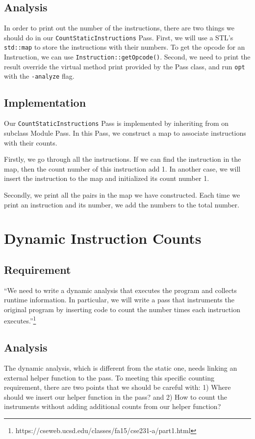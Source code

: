 \documentclass{acm_proc_article-sp}
\begin{document}
\subsection{Analysis}
In order to print out the number of the instructions, there are two things we should do in our {\tt CountStaticInstructions} Pass. First, we will use a STL's {\tt std::map} to store the instructions with their numbers. To get the opcode for an Instruction, we can use {\tt Instruction::getOpcode()}.  Second, we need to print the result override the virtual method print provided by the Pass class, and run {\tt opt} with the {\tt -analyze} flag.

\subsection{Implementation}
Our {\tt CountStaticInstructions} Pass is implemented by inheriting from on subclass Module Pass. In this Pass, we construct a map to associate instructions with their counts. 

Firstly, we go through all the instructions. If we can find the instruction in the map, then the count number of this instruction add 1. In another case, we will insert the instruction to the map and initialized its count number 1.

Secondly, we print all the {\tt < key, value>} pairs in the map we have constructed. Each time we print an instruction and its number, we add the numbers to the total number. 


\section{Dynamic Instruction Counts}

\subsection{Requirement}

``We need to write a dynamic analysis that executes the program and collects runtime information. In particular, we will write a pass that instruments the original program by inserting code to count the number times each instruction executes.''\footnote{\small https://cseweb.ucsd.edu/classes/fa15/cse231-a/part1.html}

\subsection{Analysis}
The dynamic analysis, which is different from the static one, needs linking an external helper function to the pass. To meeting this specific counting requirement, there are two points that we should be careful with: 1) Where should we insert our helper function in the pass? and 2) How to count the instruments without adding additional counts from our helper function?
\end{document}
